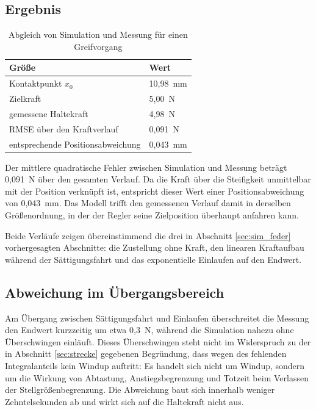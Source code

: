\subsection*{Ergebnis}

\begin{table}[htbp]
    \centering
    \caption{Abgleich von Simulation und Messung für einen Greifvorgang}
    \label{tab:abgleich_kraft}
    \begin{tabular}{ll}
        \hline
        Größe & Wert \\
        \hline
        Kontaktpunkt $x_0$              & 10,98~mm \\
        Zielkraft                       & 5,00~N \\
        gemessene Haltekraft            & 4,98~N \\
        RMSE über den Kraftverlauf      & 0,091~N \\
        entsprechende Positionsabweichung & 0,043~mm \\
        \hline
    \end{tabular}
\end{table}

Der mittlere quadratische Fehler zwischen Simulation und Messung beträgt 0,091~N über den
gesamten Verlauf. Da die Kraft über die Steifigkeit unmittelbar mit der Position
verknüpft ist, entspricht dieser Wert einer Positionsabweichung von 0,043~mm. Das Modell
trifft den gemessenen Verlauf damit in derselben Größenordnung, in der der Regler seine
Zielposition überhaupt anfahren kann.

Beide Verläufe zeigen übereinstimmend die drei in Abschnitt \ref{sec:sim_feder}
vorhergesagten Abschnitte: die Zustellung ohne Kraft, den linearen Kraftaufbau während der
Sättigungsfahrt und das exponentielle Einlaufen auf den Endwert.

\subsection*{Abweichung im Übergangsbereich}

Am Übergang zwischen Sättigungsfahrt und Einlaufen überschreitet die Messung den Endwert
kurzzeitig um etwa 0,3~N, während die Simulation nahezu ohne Überschwingen einläuft.
Dieses Überschwingen steht nicht im Widerspruch zu der in Abschnitt \ref{sec:strecke}
gegebenen Begründung, dass wegen des fehlenden Integralanteils kein Windup auftritt: Es
handelt sich nicht um Windup, sondern um die Wirkung von Abtastung, Anstiegsbegrenzung und
Totzeit beim Verlassen der Stellgrößenbegrenzung. Die Abweichung baut sich innerhalb
weniger Zehntelsekunden ab und wirkt sich auf die Haltekraft nicht aus.

